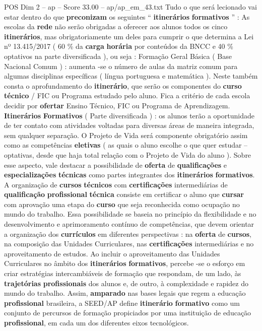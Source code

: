 \begin{textsample}{POS Dim 2 – ap – Score 33.00 – ap/ap\_em\_43.txt}
Tudo o que será lecionado vai estar dentro do que \textbf{preconizam} os seguintes “ \textbf{itinerários} \textbf{formativos} ” : As escolas da \textbf{rede} não serão obrigadas a oferecer aos alunos todos os cinco \textbf{itinerários}, mas obrigatoriamente um deles para cumprir o que determina a Lei nº 13.415/2017 ( 60 \% da \textbf{carga} \textbf{horária} por conteúdos da BNCC e 40 \% optativos na parte diversificada ), ou seja : Formação Geral Básica ( Base Nacional Comum ) : aumenta -se o número de aulas da matriz comum para algumas disciplinas específicas ( língua portuguesa e matemática ).
Neste também consta o aprofundamento do \textbf{itinerário}, que serão os componentes do \textbf{curso} \textbf{técnico} / FIC ou Programa estudado pelo aluno.
Fica a critério de cada escola decidir por \textbf{ofertar} Ensino Técnico, FIC ou Programa de Aprendizagem. \textbf{Itinerários} \textbf{Formativos} ( Parte diversificada ) : os alunos terão a oportunidade de ter contato com atividades voltadas para diversas áreas de maneira integrada, sem qualquer separação.
O Projeto de Vida será componente obrigatório assim como as competências \textbf{eletivas} ( as quais o aluno escolhe o que quer estudar – optativas, desde que haja total relação com o Projeto de Vida do aluno ).
Sobre esse aspecto, vale destacar a possibilidade de \textbf{oferta} de \textbf{qualificações} e \textbf{especializações} \textbf{técnicas} como partes integrantes dos \textbf{itinerários} \textbf{formativos}.
A organização de \textbf{cursos} \textbf{técnicos} com \textbf{certificações} intermediárias de \textbf{qualificação} \textbf{profissional} \textbf{técnica} consiste em certificar o aluno que \textbf{cursar} com aprovação uma etapa do \textbf{curso} que seja reconhecida como ocupação no mundo do trabalho.
Essa possibilidade se baseia no princípio da flexibilidade e no desenvolvimento e aprimoramento contínuo de competências, que devem orientar a organização dos \textbf{currículos} em diferentes perspectivas : na \textbf{oferta} de \textbf{cursos}, na composição das Unidades Curriculares, nas \textbf{certificações} intermediárias e no aproveitamento de estudos.
Ao incluir o aproveitamento das Unidades Curriculares no âmbito dos \textbf{itinerários} \textbf{formativos}, percebe -se o esforço em criar estratégias intercambiáveis de formação que respondam, de um lado, às \textbf{trajetórias} \textbf{profissionais} dos alunos e, de outro, à complexidade e rapidez do mundo do trabalho.
Assim, \textbf{amparado} nas bases legais que regem a educação \textbf{profissional} brasileira, a SEED/AP define \textbf{itinerário} \textbf{formativo} como um conjunto de percursos de formação propiciados por uma instituição de educação \textbf{profissional}, em cada um dos diferentes eixos tecnológicos.

\end{textsample}
